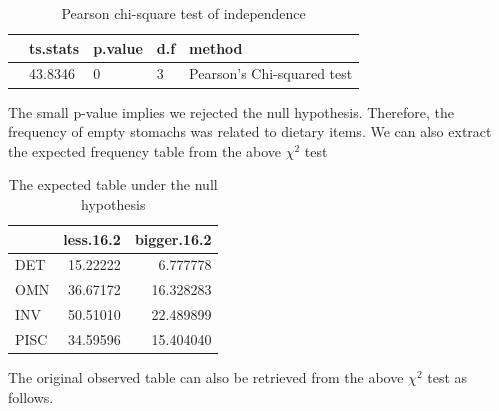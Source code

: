 \documentclass[
]{book}
\newenvironment{Shaded}{\begin{snugshade}}{\end{snugshade}}
\newcommand{\AttributeTok}[1]{\textcolor[rgb]{0.13,0.29,0.53}{#1}}
\newcommand{\FunctionTok}[1]{\textcolor[rgb]{0.13,0.29,0.53}{\textbf{#1}}}
\newcommand{\NormalTok}[1]{#1}
\newcommand{\OtherTok}[1]{\textcolor[rgb]{0.56,0.35,0.01}{#1}}
\newcommand{\SpecialCharTok}[1]{\textcolor[rgb]{0.81,0.36,0.00}{\textbf{#1}}}
\newcommand{\StringTok}[1]{\textcolor[rgb]{0.31,0.60,0.02}{#1}}
\begin{document}
\begin{table}

\caption{\label{tab:unnamed-chunk-195}Pearson chi-square test of independence}
\centering
\begin{tabular}[t]{l|l|l|l|l}
\hline
  & ts.stats & p.value & d.f & method\\
\hline
 & 43.8346 & 0 & 3 & Pearson's Chi-squared test\\
\hline
\end{tabular}
\end{table}

The small p-value implies we rejected the null hypothesis. Therefore, the frequency of empty stomachs was related to dietary items. We can also extract the expected frequency table from the above \(\chi^2\) test

\begin{Shaded}
\end{Shaded}

\begin{table}

\caption{\label{tab:unnamed-chunk-196}The expected table under the null hypothesis}
\centering
\begin{tabular}[t]{l|r|r}
\hline
  & less.16.2 & bigger.16.2\\
\hline
DET & 15.22222 & 6.777778\\
\hline
OMN & 36.67172 & 16.328283\\
\hline
INV & 50.51010 & 22.489899\\
\hline
PISC & 34.59596 & 15.404040\\
\hline
\end{tabular}
\end{table}

The original observed table can also be retrieved from the above \(\chi^2\) test as follows.

\begin{Shaded}
\end{Shaded}
\end{document}
